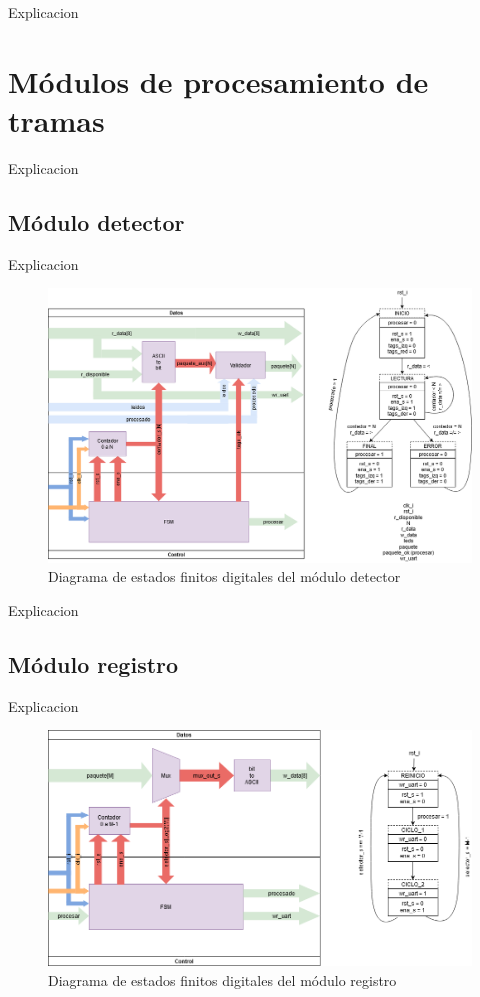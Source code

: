 		Explicacion 
		
\section{Módulos de procesamiento de tramas}

	Explicacion 
	
	\subsection{Módulo detector}
	
		Explicacion 
		
		\begin{figure}[h]
		\centering
			\includegraphics[scale=.3]{./Figures/FSMD-Detector}
			\caption{Diagrama de estados finitos digitales del módulo detector}
			\label{fig:FSMD_Detector}
		\end{figure}
		
		Explicacion 
		
	\subsection{Módulo registro}
	
		Explicacion 
		
		\begin{figure}[h]
		\centering
			\includegraphics[scale=.3]{./Figures/FSMD-Registro}
			\caption{Diagrama de estados finitos digitales del módulo registro}
			\label{fig:FSMD_Registro}
		\end{figure}

